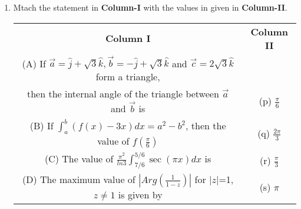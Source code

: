 \begin{enumerate}[label=\arabic*.,ref=\thesubsection.\theenumi]
\clearpage
\item Mtach the statement in \textbf{Column-I} with the values in given in \textbf{Column-II}.
\begin{table}[ht!]
\centering
\begin{tabular}{c c} 
 \textbf{Column I} & \textbf{Column II}\\ [0.5ex] 
 (A) If $\overrightarrow{a}=\hat{j}+\sqrt{3}\hat{k}, \overrightarrow{b}
     =-\hat{j}+\sqrt{3}\hat{k}$ and $\overrightarrow{c}=2\sqrt{3}\hat{k}$
     form a triangle,\\ then the internal angle of the triangle between
     $\overrightarrow{a}$ and $\overrightarrow{b}$ is                             &(p) $\frac{\pi}{6}$\\ 
 (B) If $\int_{a}^{b}(f(x)-3x)dx=a^2-b^2$, then the value of $f(\frac{\pi}{6})$   &(q) $\frac{2\pi}{3}$\\
 (C) The value of $\frac{\pi^{2}}{ln3}\int_{7/6}^{5/6}\sec(\pi x)dx$ is           &(r) $\frac{\pi}{3}$\\
 (D) The maximum value of $|Arg(\frac{1}{1-z})|$ for $|z|$=1, 
     $z \neq 1$ is given by                                                       &(s) $\pi$\\[1ex] 

\end{tabular}
\end{table}


\end{enumerate}
